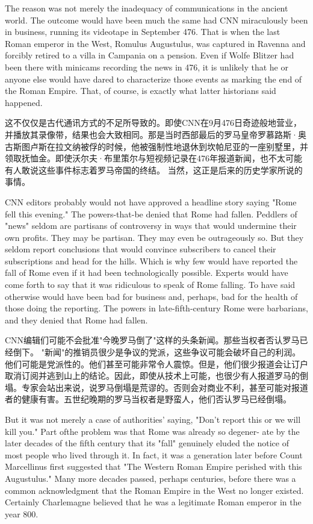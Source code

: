 \begin{Parallel}{97mm}{45mm}
  \ParallelLText
  {The reason was not merely the inadequacy of communications in the ancient world. The outcome would have been much the same had CNN miraculously been in business, running its videotape in September 476. That is when the last Roman emperor in the West, Romulus Augustulus, was captured in Ravenna and forcibly retired to a villa in Campania on a pension. Even if Wolfe Blitzer had been there with minicams recording the news in 476, it is unlikely that he or anyone else would have dared to characterize those events as marking the end of the Roman Empire. That, of course, is exactly what latter historians said happened.}
  
  \ParallelRText
  {这不仅仅是古代通讯方式的不足所导致的。即使CNN在9月476日奇迹般地营业，并播放其录像带，结果也会大致相同。那是当时西部最后的罗马皇帝罗慕路斯·奥古斯图卢斯在拉文纳被俘的时候，他被强制性地退休到坎帕尼亚的一座别墅里，并领取抚恤金。即使沃尔夫·布里策尔与短视频记录在476年报道新闻，也不太可能有人敢说这些事件标志着罗马帝国的终结。 当然，这正是后来的历史学家所说的事情。}
  \ParallelPar

  \ParallelLText
  {CNN editors probably would not have approved a headline story saying "Rome fell this evening." The powers-that-be denied that Rome had fallen. Peddlers of "news" seldom are partisans of controversy in ways that would undermine their own profits. They may be partisan. They may even be outrageously so. But they seldom report conclusions that would convince subscribers to cancel their subscriptions and head for the hills. Which is why few would have reported the fall of Rome even if it had been technologically possible. Experts would have come forth to say that it was ridiculous to speak of Rome falling. To have said otherwise would have been bad for business and, perhaps, bad for the health of those doing the reporting. The powers in late-fifth-century Rome were barbarians, and they denied that Rome had fallen.}
  
  \ParallelRText
  {CNN编辑们可能不会批准"今晚罗马倒了"这样的头条新闻。那些当权者否认罗马已经倒下。 "新闻"的推销员很少是争议的党派，这些争议可能会破坏自己的利润。他们可能是党派性的。他们甚至可能非常令人震惊。但是，他们很少报道会让订户取消订阅并逃到山上的结论。因此，即使从技术上可能，也很少有人报道罗马的倒塌。专家会站出来说，说罗马倒塌是荒谬的。否则会对商业不利，甚至可能对报道者的健康有害。五世纪晚期的罗马当权者是野蛮人，他们否认罗马已经倒塌。}
  \ParallelPar




  \ParallelLText
  {But it was not merely a case of authorities' saying, "Don't report this or we will kill you." Part ofthe problem was that Rome was already so degener- ate by the later decades of the fifth century that its "fall" genuinely eluded the notice of most people who lived through it. In fact, it was a generation later before Count Marcellinus first suggested that "The Western Roman Empire perished with this Augustulus." Many more decades passed, perhaps centuries, before there was a common acknowledgment that the Roman Empire in the West no longer existed. Certainly Charlemagne believed that he was a legitimate Roman emperor in the year 800.}
  

\end{Parallel}
